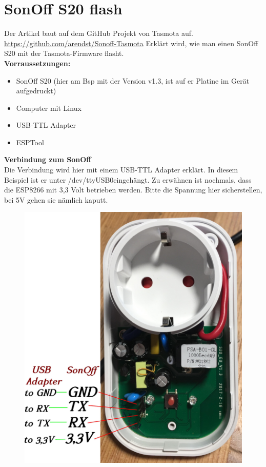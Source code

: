 \documentclass[11pt,fleqn]{book} %
\numberwithin{equation}{section} %
\numberwithin{figure}{section} %
\numberwithin{table}{section} %
\begin{document}
\section{SonOff S20 flash}
Der Artikel baut auf dem GitHub Projekt von Tasmota auf. \url{https://github.com/arendst/Sonoff-Tasmota} Erklärt wird, wie man einen SonOff S20 mit der Tasmota-Firmware flasht.\\
\textbf{Vorraussetzungen:}
\begin{itemize}
 \item SonOff S20 (hier am Bsp mit der Version v1.3, ist auf er Platine im Gerät aufgedruckt)
 \item Computer mit Linux
 \item USB-TTL Adapter
 \item ESPTool
\end{itemize}
\textbf{Verbindung zum SonOff}\\
Die Verbindung wird hier mit einem USB-TTL Adapter erklärt. In diesem Beispiel ist er unter \glqq /dev/ttyUSB0\grqq eingehängt. Zu erwähnen ist nochmals, dass die ESP8266 mit 3,3 Volt betrieben werden. Bitte die Spannung hier sicherstellen, bei 5V gehen sie nämlich kaputt. 
\begin{figure}[!h]%
\centering
    \includegraphics[scale=0.06]{Pictures/sonoff_s20.JPG}
  \caption{\label{pic:sonoff-s20-connect} }
\end{figure}
\end{document}
